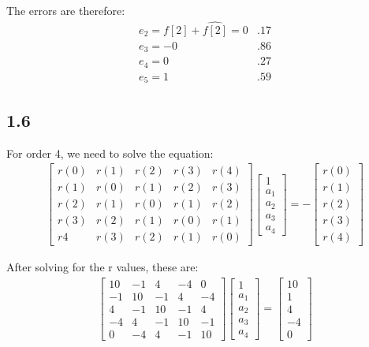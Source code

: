 \documentclass[12pt]{article}
\begin{document}
The errors are therefore:\\
\begin{align*}
e_2 = f[2] + \hat{f[2]} = 0&.17\\
e_3 = -0&.86\\
e_4 = 0&.27\\
e_5 = 1&.59
\end{align*}

\subsection*{1.6}
For order 4, we need to solve the equation:
\begin{align*}
\begin{bmatrix}
r(0) & r(1) & r(2) & r(3) & r(4) \\
r(1) & r(0) & r(1) & r(2) & r(3) \\
r(2) & r(1) & r(0) & r(1) & r(2)\\
r(3) & r(2) & r(1) & r(0) & r(1)\\
r{4} & r(3) & r(2) & r(1) & r(0)
\end{bmatrix}
\begin{bmatrix}
1\\
a_1\\
a_2\\
a_3\\
a_4
\end{bmatrix}
=
-\begin{bmatrix}
r(0)\\
r(1)\\
r(2)\\
r(3)\\
r(4)
\end{bmatrix}
\end{align*}

After solving for the r values, these are:
\begin{align*}
\begin{bmatrix}
10 & -1 & 4 & -4 & 0\\
-1 & 10 & -1 & 4 & -4\\
4 & -1 & 10 & -1 & 4 \\
-4 & 4 & -1 & 10 & -1\\
0 & -4 & 4 & -1 & 10
\end{bmatrix}
\begin{bmatrix}
1\\
a_1\\
a_2\\
a_3\\
a_4
\end{bmatrix}
=
\begin{bmatrix}
10\\
1\\
4\\
-4\\
0
\end{bmatrix}
\end{align*}
\end{document}
